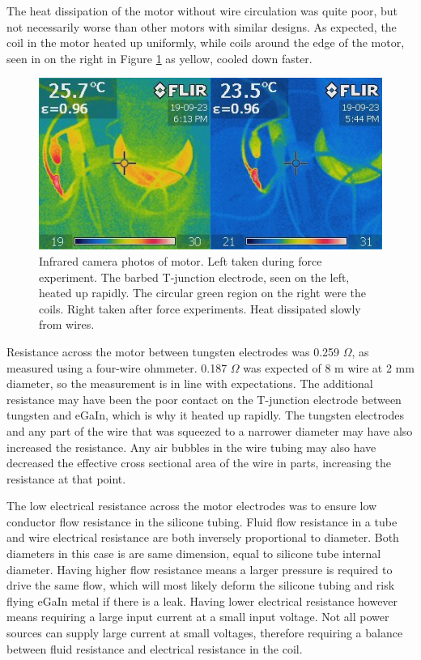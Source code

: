 \documentclass[a4paper,12pt]{article}
\begin{document}
The heat dissipation of the motor without wire circulation was quite poor, but not necessarily worse than other motors with similar designs. As expected, the coil in the motor heated up uniformly, while coils around the edge of the motor, seen in on the right in Figure \ref{fg:tjunction} as yellow, cooled down faster.

\begin{figure}[h!]
    \centering
    \includegraphics[width=\textwidth]{junctionheat.jpg}
    \caption{Infrared camera photos of motor. Left taken during force experiment. The barbed T-junction electrode, seen on the left, heated up rapidly. The circular green region on the right were the coils. Right taken after force experiments. Heat dissipated  slowly from wires.}
    \label{fg:tjunction}
\end{figure}

Resistance across the motor between tungsten electrodes was 0.259 $\Omega$, as measured using a four-wire ohmmeter. 0.187 $\Omega$ was expected of 8 m wire at 2 mm diameter, so the measurement is in line with expectations. The additional resistance may have been the poor contact on the T-junction electrode between tungsten and eGaIn, which is why it heated up rapidly. The tungsten electrodes and any part of the wire that was squeezed to a narrower diameter may have also increased the resistance. Any air bubbles in the wire tubing may also have decreased the effective cross sectional area of the wire in parts, increasing the resistance at that point.

The low electrical resistance across the motor electrodes was to ensure low conductor flow resistance in the silicone tubing. Fluid flow resistance in a tube and wire electrical resistance are both inversely proportional to diameter. Both diameters in this case is are same dimension, equal to silicone tube internal diameter. Having higher flow resistance means a larger pressure is required to drive the same flow, which will most likely deform the silicone tubing and risk flying eGaIn metal if there is a leak. Having lower electrical resistance however means requiring a large input current at a small input voltage. Not all power sources can supply large current at small voltages, therefore requiring a balance between fluid resistance and electrical resistance in the coil.
\end{document}
